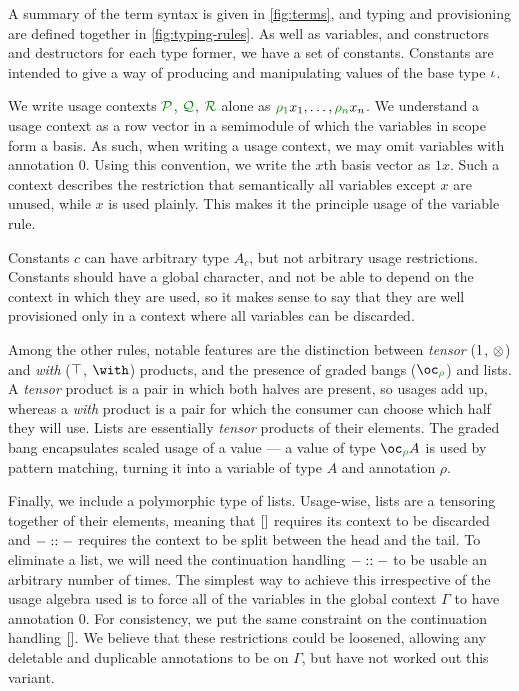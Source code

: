 A summary of the term syntax is given in \autoref{fig:terms}, and typing and
provisioning are defined together in \autoref{fig:typing-rules}.
As well as variables, and constructors and destructors for each type former, we
have a set of constants.
Constants are intended to give a way of producing and manipulating values of the
base type $\iota$.

We write usage contexts $\resctx P$, $\resctx Q$, $\resctx R$ alone as
$\rescomment{\rho_1}x_1, \ldots, \rescomment{\rho_n}x_n$.
We understand a usage context as a row vector in a semimodule of which the
variables in scope form a basis.
As such, when writing a usage context, we may omit variables with annotation
$0$.
Using this convention, we write the $x$th basis vector as $1x$.
Such a context describes the restriction that semantically all variables except
$x$ are unused, while $x$ is used plainly.
This makes it the principle usage of the variable rule.

Constants $c$ can have arbitrary type $A_c$, but not arbitrary usage
restrictions.
Constants should have a global character, and not be able to depend on the
context in which they are used, so it makes sense to say that they are well
provisioned only in a context where all variables can be discarded. 

Among the other rules, notable features are the distinction between
\emph{tensor} ($1$, $\otimes$) and \emph{with} ($\top$,
$\withT{}{}$) products, and the presence of graded bangs ($\excl{\rho}{}$) and
lists.
A \emph{tensor} product is a pair in which both halves are present, so usages
add up, whereas a \emph{with} product is a pair for which the consumer can
choose which half they will use.
Lists are essentially \emph{tensor} products of their elements.
The graded bang encapsulates scaled usage of a value --- a value of type
$\excl{\rho}{A}$ is used by pattern matching, turning it into a variable of type
$A$ and annotation $\rho$.

Finally, we include a polymorphic type of lists.
Usage-wise, lists are a tensoring together of their elements, meaning that
$[]$ requires its context to be discarded and $- :: -$ requires the
context to be split between the head and the tail.
To eliminate a list, we will need the continuation handling
$- :: -$ to be usable an arbitrary number of times.
The simplest way to achieve this irrespective of the usage algebra used is to
force all of the variables in the global context $\Gamma$ to have annotation
$0$.
For consistency, we put the same constraint on the continuation handling
$[]{}$.
We believe that these restrictions could be loosened, allowing any deletable and
duplicable annotations to be on $\Gamma$, but have not worked out this variant.

